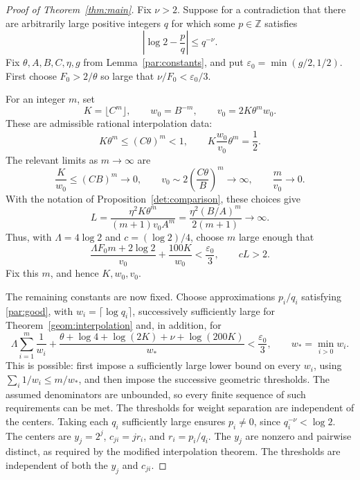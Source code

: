 \documentclass[11pt]{article}
\newcommand{\ZZ}{\mathbb Z}
\theoremstyle{definition}
\theoremstyle{remark}
\numberwithin{equation}{section}
\begin{document}
\begin{proof}[Proof of Theorem~\ref{thm:main}]
Fix \(\nu>2\). Suppose for a contradiction that there are arbitrarily
large positive integers \(q\) for which some \(p\in\ZZ\) satisfies
\begin{equation}\label{par:good}
\left|\log 2-\frac pq\right|\le q^{-\nu}.
\end{equation}
Fix \(\theta,A,B,C,\eta,g\) from Lemma~\ref{par:constants}, and put
\(\varepsilon_0=\min(g/2,1/2)\).
First choose \(F_0>2/\theta\) so large that
\(\nu/F_0<\varepsilon_0/3\).

For an integer \(m\), set
\begin{equation}\label{par:dimension}
K=\lfloor C^m\rfloor,\qquad
w_0=B^{-m},\qquad
v_0=2K\theta^m w_0.
\end{equation}
These are admissible rational interpolation data:
\begin{equation}\label{par:volume}
K\theta^m\le(C\theta)^m<1,\qquad
K\frac{w_0}{v_0}\theta^m=\frac12.
\end{equation}
The relevant limits as \(m\to\infty\) are
\begin{equation}\label{par:limits}
\frac{K}{w_0}\le(CB)^m\longrightarrow0,\qquad
v_0\sim2\left(\frac{C\theta}{B}\right)^m\longrightarrow\infty,
\qquad
\frac{m}{v_0}\longrightarrow0.
\end{equation}
With the notation of Proposition~\ref{det:comparison}, these choices give
\begin{equation}\label{par:collision-growth}
L=\frac{\eta^2K\theta^m}{(m+1)v_0A^m}
 =\frac{\eta^2(B/A)^m}{2(m+1)}\longrightarrow\infty.
\end{equation}
Thus, with \(\Lambda=4\log2\) and \(c=(\log2)/4\), choose \(m\) large
enough that
\begin{equation}\label{par:dimension-margin}
\frac{\Lambda F_0m+2\log2}{v_0}+\frac{100K}{w_0}
 <\frac{\varepsilon_0}{3},
\qquad cL>2.
\end{equation}
Fix this \(m\), and hence \(K,w_0,v_0\).

The remaining constants are now fixed. Choose approximations
\(p_i/q_i\) satisfying \eqref{par:good}, with
\(w_i=\lceil\log q_i\rceil\), successively sufficiently large for
Theorem~\ref{geom:interpolation} and, in addition, for
\begin{equation}\label{par:weight-margin}
\Lambda\sum_{i=1}^m\frac1{w_i}
+\frac{\theta+\log4+\log(2K)+\nu+\log(200K)}{w_*}
 <\frac{\varepsilon_0}{3},
\qquad w_*=\min_{i>0}w_i.
\end{equation}
This is possible: first impose a sufficiently large lower bound on
every \(w_i\), using \(\sum_i1/w_i\le m/w_*\), and then impose the
successive geometric thresholds. The assumed denominators are
unbounded, so every finite sequence of such requirements can be met.
The thresholds for weight separation are independent of the centers.
Taking each \(q_i\) sufficiently large ensures \(p_i\ne0\), since
\(q_i^{-\nu}<\log2\). The centers are \(y_j=2^j\), \(c_{ji}=jr_i\), and \(r_i=p_i/q_i\).
The \(y_j\) are nonzero and pairwise distinct, as required by the
modified interpolation theorem. The thresholds are independent of
both the \(y_j\) and \(c_{ji}\).


\end{proof}
\end{document}
